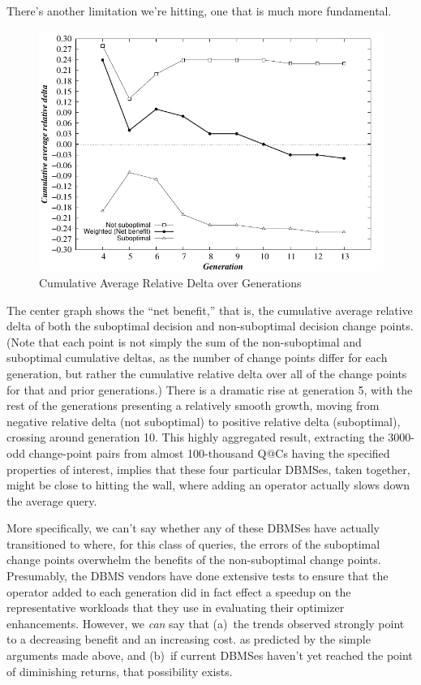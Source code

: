 \documentclass[prodmode,acmtods]{acmsmall}
\begin{document}
There's another limitation we're hitting, one that is much more fundamental.

\begin{figure}[t]
\includegraphics[width=30pc]{figures/gen_benefit.pdf}
\caption{Cumulative Average Relative Delta over Generations\label{fig:benefit}}
\end{figure}

The center graph shows the ``net benefit,'' that is, the cumulative average
relative delta
of both the suboptimal decision and non-suboptimal decision change
points. (Note that each point is not simply the sum of the non-suboptimal
and suboptimal cumulative
deltas, as the number of change points differ for each generation, but rather the cumulative
relative delta over all of the change points for that and prior generations.) There is a dramatic
rise at generation 5, with the rest of the generations presenting a
relatively smooth growth, moving from negative relative delta (not
suboptimal) to positive relative delta (suboptimal), crossing around
generation 10. This highly aggregated result, extracting the 3000-odd
change-point pairs from almost 100-thousand Q@Cs having the specified
properties of interest, implies that these four particular \hbox{DBMSes}, taken
together, might be close to hitting the wall, where adding an operator
actually slows down the average query.

More specifically, we can't say whether any of these DBMSes have actually
transitioned to where, for this class of queries, the errors of the
suboptimal change points overwhelm the benefits of the non-suboptimal change
points. Presumably, the DBMS vendors have done extensive tests to ensure
that the operator added to each generation did in fact effect a speedup on
the representative workloads that they use in evaluating their optimizer
enhancements. However, we {\em can} say that (a)~the trends observed
strongly point to a decreasing benefit and an increasing cost. as predicted
by the simple arguments made above, and (b)~if current DBMSes haven't yet
reached the point of diminishing returns, that possibility exists.
\end{document}
